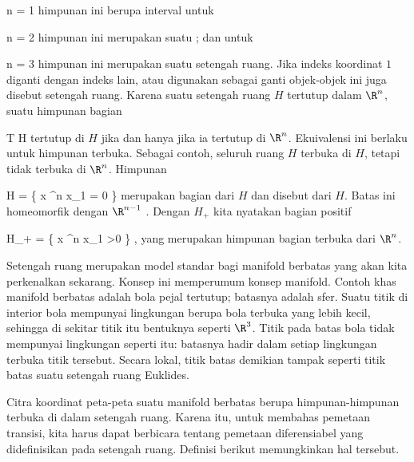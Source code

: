 \mavergleichskette
{\vergleichskette
{ n
}
{ = }{ 1
}
{  }{
}
{    }{
}
{   }{
}
}
{}{}{}
himpunan ini berupa interval
\mathl{[0, \infty)}{;} untuk

\mavergleichskette
{\vergleichskette
{ n
}
{ = }{ 2
}
{  }{
}
{    }{
}
{   }{
}
}
{}{}{}
himpunan ini merupakan suatu  {;} dan untuk

\mavergleichskette
{\vergleichskette
{ n
}
{ = }{ 3
}
{  }{
}
{    }{
}
{   }{
}
}
{}{}{}
himpunan ini merupakan suatu setengah ruang. Jika indeks koordinat $1$ diganti dengan indeks lain, atau \anfuehrung{$\leq$}{} digunakan sebagai ganti \anfuehrung{$\geq$ }{,} objek-objek ini juga disebut setengah ruang. Karena suatu setengah ruang $H$ tertutup dalam $\R^n$, suatu himpunan bagian

\mavergleichskette
{\vergleichskette
{ T
}
{ \subseteq }{ H
}
{  }{
}
{    }{
}
{   }{
}
}
{}{}{}
tertutup di $H$ jika dan hanya jika ia tertutup di $\R^n$. Ekuivalensi ini
 berlaku untuk himpunan terbuka. Sebagai contoh, seluruh ruang $H$ terbuka di $H$, tetapi tidak terbuka di $\R^n$. Himpunan

\mavergleichskettedisp
{\vergleichskette
{ \partial H
}
{ =} { \left\{  x \in \R^n   \mid   x_1 = 0        \right\}
}
{ } {
}
{ } {
}
{ } {
}
}
{}{}{}
merupakan bagian dari $H$ dan disebut  {} dari $H$. Batas ini homeomorfik dengan $\R^{n-1}$
 {} {.}
Dengan $H_+$ kita nyatakan bagian positif

\mavergleichskette
{\vergleichskette
{ H_+
}
{ = }{ \left\{  x \in \R^n   \mid   x_1 >0        \right\}
}
{  }{
}
{    }{
}
{   }{
}
}
{}{}{,}
yang merupakan himpunan bagian terbuka dari $\R^n$.

Setengah ruang merupakan model standar bagi manifold berbatas yang akan kita perkenalkan sekarang. Konsep ini memperumum konsep manifold. Contoh khas manifold berbatas adalah bola pejal tertutup; batasnya adalah sfer. Suatu titik di interior bola mempunyai lingkungan berupa bola terbuka yang lebih kecil, sehingga di sekitar titik itu bentuknya  seperti $\R^3$. Titik pada batas bola tidak mempunyai lingkungan seperti itu: batasnya hadir dalam setiap lingkungan terbuka titik tersebut. Secara lokal, titik batas demikian tampak seperti titik batas suatu setengah ruang Euklides.

Citra koordinat peta-peta suatu manifold berbatas berupa himpunan-himpunan terbuka di dalam setengah ruang. Karena itu, untuk membahas pemetaan transisi, kita harus dapat berbicara tentang pemetaan diferensiabel yang didefinisikan pada setengah ruang. Definisi berikut memungkinkan hal tersebut.

